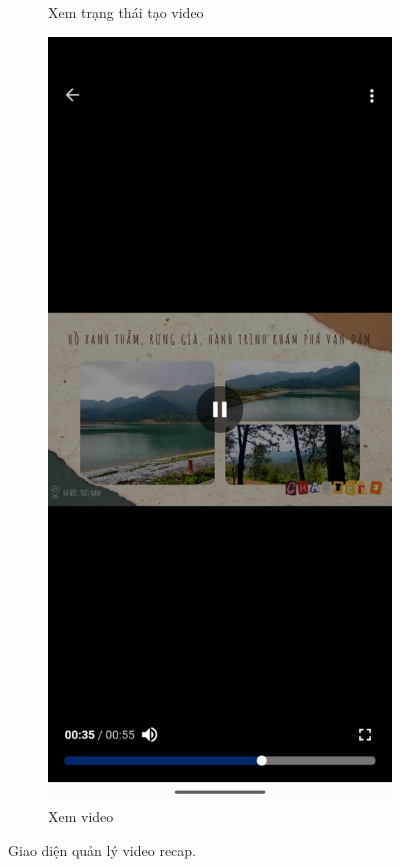 \begin{figure}[H]
\begin{subfigure}{0.32\textwidth}
        \caption{Xem trạng thái tạo video}
    \end{subfigure}
    \hfill
    \begin{subfigure}{0.32\textwidth}
        \includegraphics[width=1\linewidth]{figures/c4/4-2/video_3.png} 
        \caption{Xem video}
    \end{subfigure}
    \caption{Giao diện quản lý video recap.}
    \label{fig:video_recap}
\end{figure}


